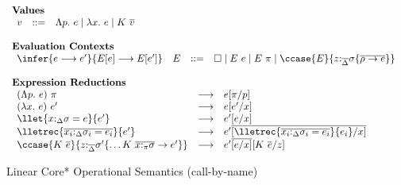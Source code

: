 
\begin{figure}[h]
\begin{framed}
\small
\[
\begin{array}{l}
%
\textbf{Values} \\
\begin{array}{lcl}
    v & ::= & \Lambda p.~e \mid \lambda x.~e \mid K~\overline{v} \\
\end{array}\\\\
%
\textbf{Evaluation Contexts}\\
\begin{array}{llcl}
\infer{e \longrightarrow e'}{E[e] \longrightarrow E[e']} & E & ::= & \square \mid E~e \mid E~\pi \mid \ccase{E}{z{:}_{\overline{\Delta}}\sigma \{\overline{\rho \to e}\}} \\
\end{array}\\\\
%
\textbf{Expression Reductions}\\
\begin{array}{lcl}
(\Lambda p.~e)~\pi & \longrightarrow & e[\pi/p]\\
(\lambda x.~e)~e' & \longrightarrow & e[e'/x]\\
\llet{x{:}_\Delta\sigma = e}{e'} & \longrightarrow & e'[e/x]\\
\lletrec{\overline{x_i{:}_\Delta\sigma_i = e_i}}{e'} & \longrightarrow &
    e'\overline{[\lletrec{\overline{x_i{:}_\Delta\sigma_i = e_i}}{e_i}/x]}\\
    \ccase{K~\overline{e}}{z{:}_{\overline{\Delta}}\sigma' \{\dots K~\overline{x{:}_\pi\sigma} \to e'\}} &
    \longrightarrow & e'\overline{[e/x]}[K~\overline{e}/z]\\
\end{array}
\end{array}
\]
\end{framed}
\caption{Linear Core* Operational Semantics \small(call-by-name)}
\label{linear-core-operational-semantics}
\end{figure}

